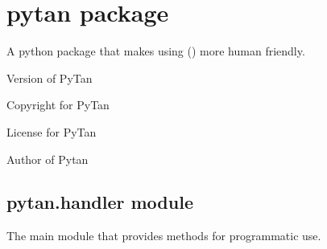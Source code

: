 \documentclass[letterpaper,10pt,english]{sphinxmanual}
\begin{document}
\section{pytan package}
\label{pytan:pytan-package}\label{pytan:module-pytan}\label{pytan::doc}
A python package that makes using ({\hyperref[taniumpy:module-taniumpy]{}}) more human friendly.

\begin{fulllineitems}
\label{pytan:pytan.__version__}
Version of PyTan

\end{fulllineitems}


\begin{fulllineitems}
\label{pytan:pytan.__copyright__}
Copyright for PyTan

\end{fulllineitems}


\begin{fulllineitems}
\label{pytan:pytan.__license__}
License for PyTan

\end{fulllineitems}


\begin{fulllineitems}
\label{pytan:pytan.__author__}
Author of Pytan

\end{fulllineitems}



\subsection{pytan.handler module}
\label{pytan.handler:pytan-handler-module}\label{pytan.handler:module-pytan.handler}\label{pytan.handler::doc}
The main {\hyperref[pytan:module-pytan]{}} module that provides methods for programmatic use.
\end{document}
